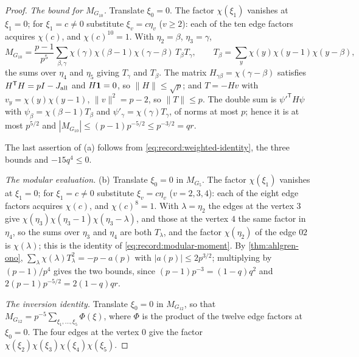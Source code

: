 \begin{proof}
\emph{The bound for $M_{G_{10}}$.} Translate $\xi_0=0$. The factor $\chi(\xi_1)$
vanishes at $\xi_1=0$; for $\xi_1=c\ne0$ substitute $\xi_v=c\eta_v$ ($v\ge2$):
each of the ten edge factors acquires $\chi(c)$, and $\chi(c)^{10}=1$. With
$\eta_2=\beta$, $\eta_3=\gamma$,
\[
 M_{G_{10}}=\frac{p-1}{p^5}\sum_{\beta,\gamma}\chi(\gamma)\chi(\beta-1)
 \chi(\gamma-\beta)\,T_\beta T_\gamma,\qquad
 T_\beta=\sum_y\chi(y)\chi(y-1)\chi(y-\beta),
\]
the sums over $\eta_4$ and $\eta_5$ giving $T_\gamma$ and $T_\beta$. The matrix
$H_{\gamma\beta}=\chi(\gamma-\beta)$ satisfies $H^{\mathsf T}H=pI-J_{\mathrm{all}}$ and
$H\mathbf 1=0$, so $\|H\|\le\sqrt p$; and $T=-Hv$ with $v_y=\chi(y)\chi(y-1)$,
$\|v\|^2=p-2$, so $\|T\|\le p$. The double sum is $\psi'^{\mathsf T}H\psi$ with
$\psi_\beta=\chi(\beta-1)T_\beta$ and $\psi'_\gamma=\chi(\gamma)T_\gamma$, of norms
at most $p$; hence it is at most $p^{5/2}$ and
$|M_{G_{10}}|\le(p-1)p^{-5/2}\le p^{-3/2}=qr$.

The last assertion of (a) follows from \eqref{eq:record:weighted-identity}, the
three bounds and $-15q^4\le0$.

\emph{The modular evaluation.} (b) Translate $\xi_0=0$ in $M_{G_5}$. The factor
$\chi(\xi_1)$ vanishes at $\xi_1=0$; for $\xi_1=c\ne0$ substitute $\xi_v=c\eta_v$
($v=2,3,4$): each of the eight edge factors acquires $\chi(c)$, and
$\chi(c)^8=1$. With $\lambda=\eta_2$ the edges at the vertex $3$ give
$\chi(\eta_3)\chi(\eta_3-1)\chi(\eta_3-\lambda)$, and those at the vertex $4$ the
same factor in $\eta_4$, so the sums over $\eta_3$ and $\eta_4$ are both
$T_\lambda$, and the factor $\chi(\eta_2)$ of the edge $02$ is $\chi(\lambda)$; this
is the identity of \eqref{eq:record:modular-moment}. By \cref{thm:ahlgren-ono},
$\sum_\lambda\chi(\lambda)T_\lambda^2=-p-a(p)$ with $|a(p)|\le2p^{3/2}$; multiplying
by $(p-1)/p^4$ gives the two bounds, since $(p-1)p^{-3}=(1-q)q^2$ and
$2(p-1)p^{-5/2}=2(1-q)qr$.

\emph{The inversion identity.} Translate $\xi_0=0$ in $M_{G_{12}}$, so that
$M_{G_{12}}=p^{-5}\sum_{\xi_1,\dots,\xi_5}\Phi(\xi)$, where $\Phi$ is the product of
the twelve edge factors at $\xi_0=0$. The four edges at the vertex $0$ give the
factor $\chi(\xi_2)\chi(\xi_3)\chi(\xi_4)\chi(\xi_5)$.


\end{proof}
